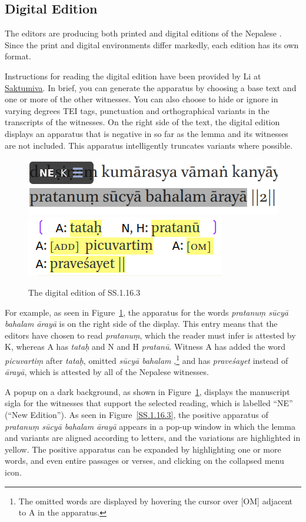\subsection{Digital Edition}
The editors are producing both printed and digital editions of the Nepalese 
\SS. Since the print and digital environments differ markedly, each edition has 
its own format. 

Instructions for reading the digital edition have been provided by  Li at 
\href{https://saktumiva.org/wiki/users}{Saktumiva}. In brief, you can 
generate the apparatus by choosing a base text and one or more of the other 
witnesses. You can also choose to hide or ignore in varying degrees TEI 
tags, punctuation and orthographical variants in the transcripts of the witnesses. 
On the right side of the text, the digital edition displays an apparatus that is 
negative in so far as the lemma and its witnesses are not included. This apparatus 
intelligently truncates variants where possible. 

\begin{figure}[t]
    \centering
    \includegraphics[draft=false,width=.5\textwidth]{media/SS.1.16.3c}
    \quad
    \includegraphics[draft=false,width=.35\textwidth]{media/SS.1.16.3d}
    \caption{The digital edition of SS.1.16.3}
    \label{SS.1.16}
\end{figure}
For example, as seen in Figure~\ref{SS.1.16}, the apparatus for the words 
\emph{pratanuṃ sūcyā bahalam ārayā} is on the right side of the display. 
This entry means that the editors have chosen to read 
\emph{pratanuṃ}, which the reader must infer is attested by K, whereas A has 
\emph{tataḥ} and N and H \emph{pratanū}. Witness A has added the word 
\emph{picuvartiṃ} after \emph{tataḥ}, omitted \emph{sūcyā bahalam },\footnote{The 
omitted words are displayed by hovering the cursor over [OM] adjacent to A in the 
apparatus.} and has \emph{praveśayet} instead of \emph{ārayā}, which is attested by all 
of the Nepalese witnesses. 

A popup on a dark background, as shown in Figure~\ref{SS.1.16}, displays the
manuscript sigla for the witnesses that support the selected reading, which is
labelled “NE” (“New Edition”). As seen in Figure~\ref{SS.1.16.3}, the positive
apparatus of \emph{pratanuṃ sūcyā bahalam ārayā} appears in a pop-up window in
which the lemma and variants are aligned according to letters, and the variations
are highlighted in yellow. The positive apparatus can be expanded by highlighting
one or more words, and even entire passages or verses, and clicking on the
collapsed menu icon.

